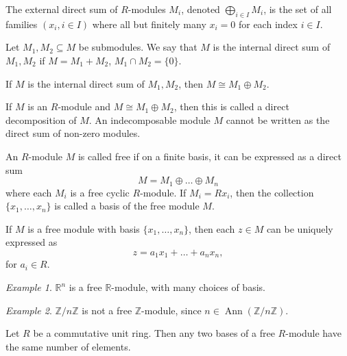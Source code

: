 \documentclass[11pt]{article}
\newcommand{\R}{\mathbb{R}}
\newcommand{\Z}{\mathbb{Z}}
\DeclareMathOperator{\Ann}{Ann}
\theoremstyle{definition}
\theoremstyle{remark}
\newtheorem*{example}{Example}
\numberwithin{equation}{section}
\begin{document}
    \begin{definition}
        The external direct sum of $R$-modules $M_i$, denoted $\bigoplus_{i \in
        I} M_i$, is the set of all families $(x_i, i \in I)$ where all but finitely
        many $x_i = 0$ for each index $i \in I$.
    \end{definition}

    \begin{definition}
        Let $M_1, M_2 \subseteq M$ be submodules. We say that $M$ is the internal
        direct sum of $M_1, M_2$ if $M = M_1 + M_2$, $M_1 \cap M_2 = \{0\}$.
    \end{definition}

    \begin{lemma}
        If $M$ is the internal direct sum of $M_1, M_2$, then $M \cong M_1 \oplus
        M_2$.
    \end{lemma}
    \begin{definition}
        If $M$ is an $R$-module and $M \cong M_1 \oplus M_2$, then this is called a
        direct decomposition of $M$. An indecomposable module $M$ cannot be written
        as the direct sum of non-zero modules.
    \end{definition}

    \begin{definition}
        An $R$-module $M$ is called free if on a finite basis, it can be expressed as
        a direct sum \[
            M = M_1 \oplus \dots \oplus M_n
        \] where each $M_i$ is a free cyclic $R$-module. If $M_i = Rx_i$, then the
        collection $\{x_1, \dots, x_n\}$ is called a basis of the free module $M$.
    \end{definition}
    \begin{lemma}
        If $M$ is a free module with basis $\{x_1, \dots, x_n\}$, then each $z \in M$
        can be uniquely expressed as \[
            z = a_1x_1 + \dots + a_nx_n,
        \] for $a_i \in R$.
    \end{lemma}
    \begin{example}
        $\R^n$ is a free $\R$-module, with many choices of basis.
    \end{example}
    \begin{example}
        $\Z/n\Z$ is not a free $\Z$-module, since $n \in \Ann(\Z/n\Z)$.
    \end{example}

    \begin{lemma}
        Let $R$ be a commutative unit ring. Then any two bases of a free $R$-module
        have the same number of elements.
    \end{lemma}
\end{document}
